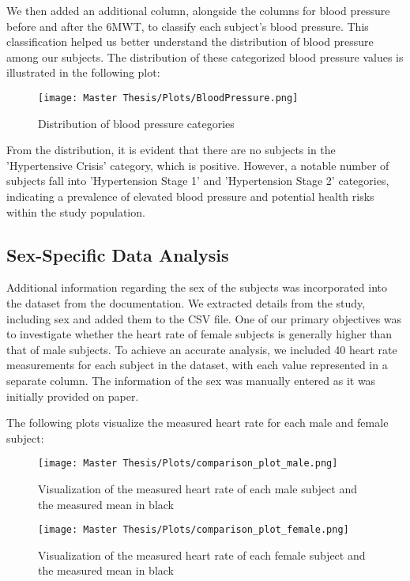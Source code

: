 We then added an additional column, alongside the columns for blood pressure before and after the 6MWT, to classify each subject's blood pressure. This classification helped us better understand the distribution of blood pressure among our subjects. The distribution of these categorized blood pressure values is illustrated in the following plot:

\FloatBarrier
\begin{figure}[h!]
    \centering
    \texttt{[image: Master Thesis/Plots/BloodPressure.png]}
    \caption{Distribution of blood pressure categories}
    \label{fig:blood_pressure_distribution}
\end{figure}
\FloatBarrier

From the distribution, it is evident that there are no subjects in the 'Hypertensive Crisis' category, which is positive. However, a notable number of subjects fall into 'Hypertension Stage 1' and 'Hypertension Stage 2' categories, indicating a prevalence of elevated blood pressure and potential health risks within the study population. 

\subsection{Sex-Specific Data Analysis}

Additional information regarding the sex of the subjects was incorporated into the dataset from the documentation. We extracted details from the study, including sex and added them to the CSV file. One of our primary objectives was to investigate whether the heart rate of female subjects is generally higher than that of male subjects. To achieve an accurate analysis, we included 40 heart rate measurements for each subject in the dataset, with each value represented in a separate column. The information of the sex was manually entered as it was initially provided on paper.

The following plots visualize the measured heart rate for each male and female subject:

\FloatBarrier
\begin{figure}[h!]
  \centering
  \begin{minipage}[b]{0.9\linewidth}
    \texttt{[image: Master Thesis/Plots/comparison\_plot\_male.png]}
    \caption{Visualization of the measured heart rate of each male subject and the measured mean in black}
    \label{fig:allmeashrdatamale}
  \end{minipage}
  \quad %
  \begin{minipage}[b]{0.9\linewidth}
    \texttt{[image: Master Thesis/Plots/comparison\_plot\_female.png]}
    \caption{Visualization of the measured heart rate of each female subject and the measured mean in black}
    \label{fig:allmeashrdatafemale}
  \end{minipage}
\end{figure}
\FloatBarrier

